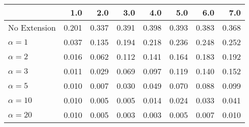 \begin{tabular}{lrrrrrrr}
\toprule
{} &   1.0 &   2.0 &   3.0 &   4.0 &   5.0 &   6.0 &   7.0 \\
\midrule
No Extension  & 0.201 & 0.337 & 0.391 & 0.398 & 0.393 & 0.383 & 0.368 \\
$\alpha = 1$  & 0.037 & 0.135 & 0.194 & 0.218 & 0.236 & 0.248 & 0.252 \\
$\alpha = 2$  & 0.016 & 0.062 & 0.112 & 0.141 & 0.164 & 0.183 & 0.192 \\
$\alpha = 3$  & 0.011 & 0.029 & 0.069 & 0.097 & 0.119 & 0.140 & 0.152 \\
$\alpha = 5$  & 0.010 & 0.007 & 0.030 & 0.049 & 0.070 & 0.088 & 0.099 \\
$\alpha = 10$ & 0.010 & 0.005 & 0.005 & 0.014 & 0.024 & 0.033 & 0.041 \\
$\alpha = 20$ & 0.010 & 0.005 & 0.003 & 0.003 & 0.005 & 0.007 & 0.010 \\
\bottomrule
\end{tabular}
